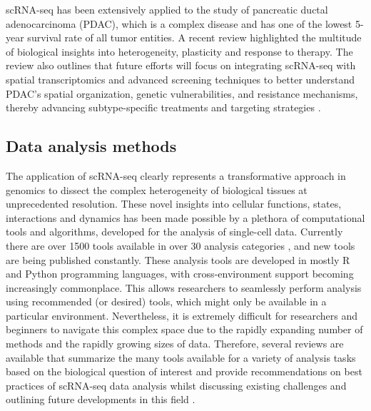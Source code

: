 scRNA-seq has been extensively applied to the study of pancreatic ductal adenocarcinoma (PDAC), which is a complex disease and has one of the lowest 5-year survival rate of all tumor entities. A recent review highlighted the multitude of biological insights into heterogeneity, plasticity and response to therapy. The review also outlines that future efforts will focus on integrating scRNA-seq with spatial transcriptomics and advanced screening techniques to better understand PDAC's spatial organization, genetic vulnerabilities, and resistance mechanisms, thereby advancing subtype-specific treatments and targeting strategies \textbf{\cite{barthel_single-cell_2023}}.

\clearpage

\subsection{Data analysis methods}
\label{sec:scrna_analysis}
The application of scRNA-seq clearly represents a transformative approach in genomics to dissect the complex heterogeneity of biological tissues at unprecedented resolution. These novel insights into cellular functions, states, interactions and dynamics has been made possible by  a plethora of computational tools and algorithms, developed for the analysis of single-cell data. Currently there are over 1500 tools available in over 30 analysis categories \textbf{\cite{noauthor_scrna-tools_nodate}}, and new tools are being published constantly. These analysis tools are developed in mostly R and Python programming languages, with cross-environment support becoming increasingly commonplace. This allows researchers to seamlessly perform analysis using recommended (or desired) tools, which might only be available in a particular environment. Nevertheless, it is extremely difficult for researchers and beginners to navigate this complex space due to the rapidly expanding number of methods and the rapidly growing sizes of data. Therefore, several reviews are available that summarize the many tools available for a variety of analysis tasks based on the biological question of interest and provide recommendations on best practices of scRNA-seq data analysis whilst discussing existing challenges and outlining future developments in this field \textbf{\cite{lueckenmalte_d_current_2019,zappia_exploring_2018,wu_tools_2020,balzer_how_2021,su_data_2022,ke_single_2022,heumos_best_2023}}.
\vspace{1cm}

